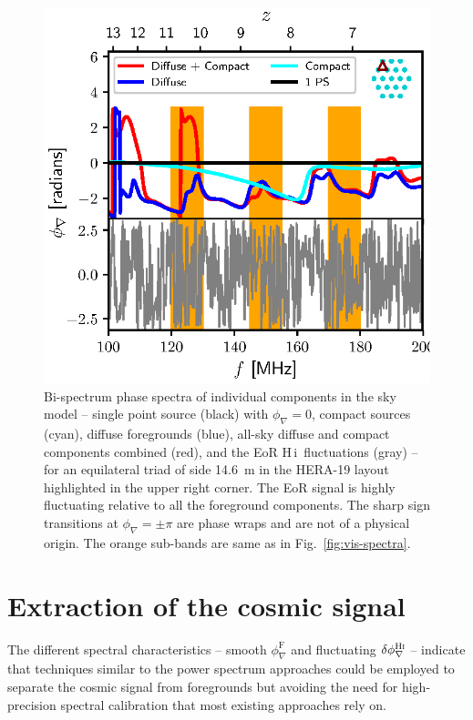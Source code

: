 \documentclass[
reprint,
superscriptaddress,
amsmath,
amssymb,
aps,
prd
]{revtex4-1}
\newcommand{\HI}{H\,{\sc i}}
\begin{document}
\begin{figure}[htb]
\includegraphics[width=0.85\linewidth]{closure_phase_spectra_0_1_8}
\caption{Bi-spectrum phase spectra of individual components in the sky model -- single point source (black) with $\phi_\nabla=0$, compact sources (cyan), diffuse foregrounds (blue), all-sky diffuse and compact components combined (red), and the EoR \HI\ fluctuations (gray) -- for an equilateral triad of side 14.6~m in the HERA-19 layout highlighted in the upper right corner. The EoR signal is highly fluctuating relative to all the foreground components. The sharp sign transitions at $\phi_\nabla=\pm \pi$ are phase wraps and are not of a physical origin. The orange sub-bands are same as in Fig.~\ref{fig:vis-spectra}. \label{fig:cp-spectra}}
\end{figure}

\section{Extraction of the cosmic signal}\label{sec:extraction}

The different spectral characteristics -- smooth $\phi_\nabla^\textrm{F}$ and fluctuating $\delta\phi_\nabla^\textrm{H{\sc i}}$ -- indicate that techniques similar to the power spectrum approaches could be employed to separate the cosmic signal from foregrounds but avoiding the need for high-precision spectral calibration that most existing approaches rely on.
\end{document}
